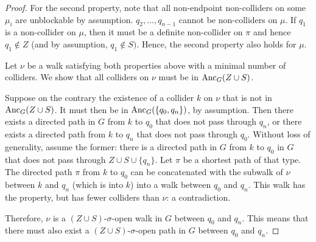 \begin{proof}
  For the second property, note that all non-endpoint non-colliders on some $\mu_i$ are unblockable by assumption.
  $q_2,\dots,q_{n-1}$ cannot be non-colliders on $\mu$.
  If $q_1$ is a non-collider on $\mu$, then it must be a definite non-collider on $\pi$ and hence $q_1 \notin Z$ (and by assumption, $q_1 \notin S)$.
  Hence, the second property also holds for $\mu$.

  Let $\nu$ be a walk satisfying both properties above with a minimal number of colliders.
  We show that all colliders on $\nu$ must be in $\mathrm{Anc}_{G}(Z \cup S)$. 

  Suppose on the contrary the existence of a collider $k$ on $\nu$ that is not in $\mathrm{Anc}_G(Z \cup S)$. 
  It must then be in $\mathrm{Anc}_G(\{q_0,q_n\})$, by assumption.
  Then there exists a directed path in $G$ from $k$ to $q_0$ that does not pass through $q_n$, or there exists a directed path from $k$ to $q_n$ that does not pass through $q_0$.
  Without loss of generality, assume the former:
  there is a directed path in $G$ from $k$ to $q_0$ in $G$ that does not pass through $Z \cup S \cup \{q_n\}$.
  Let $\pi$ be a shortest path of that type.
  The directed path $\pi$ from $k$ to $q_0$ can be concatenated with the subwalk of $\nu$ between $k$ and $q_n$ (which is into $k$) into a walk between $q_0$ and $q_n$.
  This walk has the property, but has fewer colliders than $\nu$: a contradiction.

  Therefore, $\nu$ is a $(Z \cup S)$-$\sigma$-open walk in $G$ between $q_0$ and $q_n$.
  This means that there must also exist a $(Z \cup S)$-$\sigma$-open path in $G$ between $q_0$ and $q_n$.
\end{proof}

